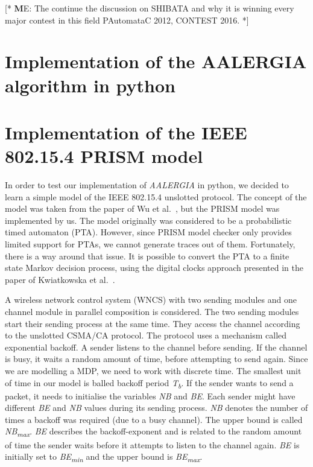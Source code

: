 \documentclass[
a4paper,
12pt
]{scrartcl}
\newcommand\me[1]{ [* {\textbf ME:} #1 *]}
\begin{document}
\me{The continue the discussion on SHIBATA and why it is winning every major contest in this field  PAutomataC 2012, CONTEST 2016.}

\section{Implementation of the AALERGIA algorithm in python}


\section{Implementation of the IEEE 802.15.4 PRISM model}
In order to test our implementation of \emph{AALERGIA} in python, we decided to learn a simple model of the IEEE 802.15.4 unslotted protocol. The concept of the model was taken from the paper of Wu et al.~\cite{stability}, but the PRISM model was implemented by us. The model originally was considered to be a probabilistic timed automaton (PTA). However, since PRISM model checker only provides limited support for PTAs, we cannot generate traces out of them. Fortunately, there is a way around that issue. It is possible to convert the PTA to a finite state Markov decision process, using the digital clocks approach presented in the paper of Kwiatkowska et al.~\cite{KNPS06}.

A wireless network control system (WNCS) with two sending modules and one channel module in parallel composition is considered. The two sending modules start their sending process at the same time. They access the channel according to the unslotted CSMA/CA protocol. The protocol uses a mechanism called exponential backoff. A sender listens to the channel before sending. If the channel is busy, it waits a random amount of time, before attempting to send again. Since we are modelling a MDP, we need to work with discrete time. The smallest unit of time in our model is balled backoff period \textit{T\textsubscript{b}}. If the sender wants to send a packet, it needs to initialise the variables \textit{NB} and \textit{BE}. Each sender might have different \textit{BE} and \textit{NB} values during its sending process. \textit{NB} denotes the number of times a backoff was required (due to a busy channel). The upper bound is called \textit{NB\textsubscript{max}}. \textit{BE} describes the backoff-exponent and is related to the random amount of time the sender waits before it attempts to listen to the channel again. \textit{BE} is initially set to \textit{BE\textsubscript{min}} and the upper bound is \textit{BE\textsubscript{max}}.
\end{document}
